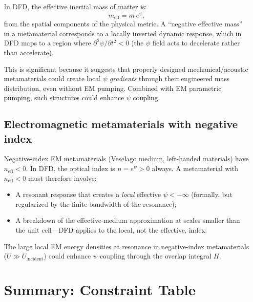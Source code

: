 \documentclass[12pt,letterpaper]{article}
\begin{document}
In DFD, the effective inertial mass of matter is:
\begin{equation}
  m_{\text{eff}} = m\,e^{\psi},
\end{equation}
from the spatial components of the physical metric.  A ``negative
effective mass'' in a metamaterial corresponds to a locally inverted
dynamic response, which in DFD maps to a region where
$\partial^2\psi/\partial t^2 < 0$ (the $\psi$ field acts to
decelerate rather than accelerate).

This is significant because it suggests that properly designed
mechanical/acoustic metamaterials could create local $\psi$
\emph{gradients} through their engineered mass distribution, even
without EM pumping.  Combined with EM parametric pumping, such
structures could enhance $\psi$ coupling.

\subsection{Electromagnetic metamaterials with negative index}

Negative-index EM metamaterials (Veselago medium, left-handed materials)
have $n_{\text{eff}} < 0$.  In DFD, the optical index is $n = e^\psi > 0$
always.  A metamaterial with $n_{\text{eff}} < 0$ must therefore involve:
\begin{itemize}[noitemsep]
  \item A resonant response that creates a \emph{local} effective
    $\psi < -\infty$ (formally, but regularized by the finite
    bandwidth of the resonance);
  \item A breakdown of the effective-medium approximation at scales
    smaller than the unit cell---DFD applies to the local, not the
    effective, index.
\end{itemize}

The large local EM energy densities at resonance in negative-index
metamaterials ($U \gg U_{\text{incident}}$) could enhance $\psi$
coupling through the overlap integral $H$.

\section{Summary: Constraint Table}
\end{document}
